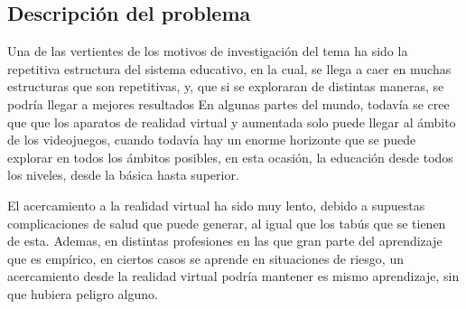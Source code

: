 \subsection{Descripción del problema}
Una de las vertientes de los motivos de investigación del tema ha sido la repetitiva estructura del sistema educativo, en la cual, se llega a caer en muchas estructuras que son repetitivas, y, que si se exploraran de distintas maneras, se podría llegar a mejores resultados
En algunas partes del mundo, todavía se cree que que los aparatos de realidad virtual y aumentada solo puede llegar al ámbito de los videojuegos, cuando todavía hay un enorme horizonte que se puede explorar en todos los ámbitos posibles, en esta ocasión, la educación desde todos los niveles, desde la básica hasta superior.

El acercamiento a la realidad virtual ha sido muy lento, debido a supuestas complicaciones de salud que puede generar, al igual que los tabús que se tienen de esta. Ademas, en distintas profesiones en las que gran parte del aprendizaje que es empírico, en ciertos casos se aprende en situaciones de riesgo, un acercamiento desde la realidad virtual podría mantener es mismo aprendizaje, sin que hubiera peligro alguno.
